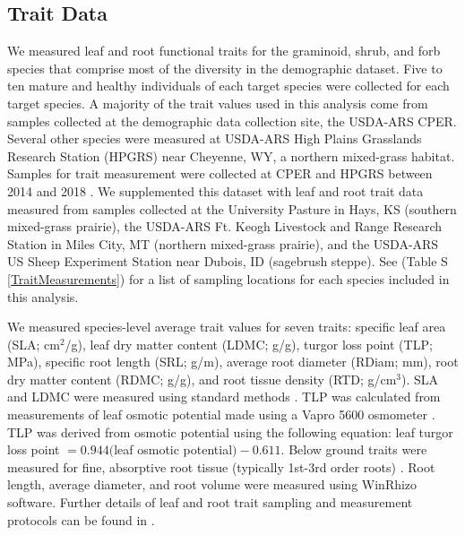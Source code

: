 \documentclass[12pt, letterpaper]{article}
\begin{document}
\subsection{Trait Data} We measured leaf and root functional traits for the graminoid, shrub, and forb species that comprise most of the diversity in the demographic dataset. Five to ten mature and healthy individuals of each target species were collected for each target species. A majority of the trait values used in this analysis come from samples collected at the demographic data collection site, the USDA-ARS CPER. Several other species were measured at USDA-ARS High Plains Grasslands Research Station (HPGRS) near Cheyenne, WY, a northern mixed-grass habitat. Samples for trait measurement were collected at CPER and HPGRS between 2014 and 2018 \citep{Blumenthal2020}. We supplemented this dataset with leaf and root trait data measured from samples collected at the University Pasture in Hays, KS (southern mixed-grass prairie), the USDA-ARS Ft. Keogh Livestock and Range Research Station in Miles City, MT (northern mixed-grass prairie), and the USDA-ARS US Sheep Experiment Station near Dubois, ID (sagebrush steppe). See (Table S \ref{TraitMeasurements}) for a list of sampling locations for each species included in this analysis. 

We measured species-level average trait values for seven traits: specific leaf area (SLA; cm$^2$/g), leaf dry matter content (LDMC; g/g), turgor loss point (TLP; MPa), specific root length (SRL; g/m), average root diameter (RDiam; mm), root dry matter content (RDMC; g/g), and root tissue density (RTD; g/cm$^3$). SLA and LDMC were measured using standard methods \citep{Perez-Harguindeguy2013}. TLP was calculated from measurements of leaf osmotic potential made using a Vapro 5600 osmometer \citep{Bartlett2012, Griffin-Nolan2019}. TLP was derived from osmotic potential using the following equation: leaf turgor loss point $= 0.944($leaf osmotic potential$) - 0.611$. Below ground traits were measured for fine, absorptive root tissue (typically 1st-3rd order roots) \citep{McCormack2015}. Root length, average diameter, and root volume were measured using WinRhizo software. Further details of leaf and root trait sampling and measurement protocols can be found in \cite{Blumenthal2020}.
\end{document}
